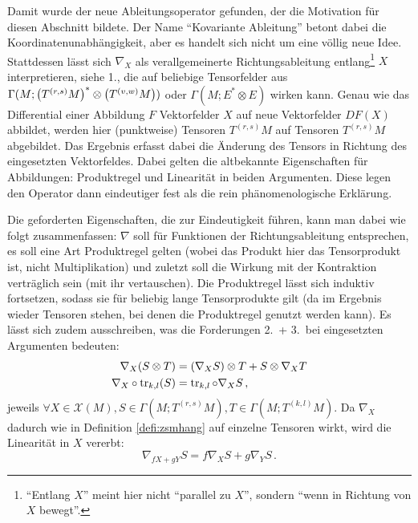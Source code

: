 \documentclass[../H_Analysis_main.tex]{subfiles}
\begin{document}
Damit wurde der neue Ableitungsoperator gefunden, der die Motivation für diesen Abschnitt bildete. Der Name \enquote{Kovariante Ableitung} betont dabei die Koordinatenunabhängigkeit, aber es handelt sich nicht um eine völlig neue Idee. Stattdessen lässt sich $\nabla_X$ als verallgemeinerte Richtungsableitung entlang\footnote{\enquote{Entlang $X$} meint hier nicht \enquote{parallel zu $X$}, sondern \enquote{wenn in Richtung von $X$ bewegt}.} $X$ interpretieren, siehe 1., die auf beliebige Tensorfelder aus $\Gamma(M; \qty(T^{(r, s)} M)^* \otimes \qty(T^{(v, w)} M))$ oder $\Gamma(M; E^* \otimes E)$ wirken kann. Genau wie das Differential einer Abbildung $F$ Vektorfelder $X$ auf neue Vektorfelder $DF(X)$ abbildet, werden hier (punktweise) Tensoren $T^{(r, s)} M$ auf Tensoren $T^{(r, s)} M$ abgebildet. Das Ergebnis erfasst dabei die Änderung des Tensors in Richtung des eingesetzten Vektorfeldes. Dabei gelten die altbekannte Eigenschaften für Abbildungen: Produktregel und Linearität in beiden Argumenten. Diese legen den Operator dann eindeutiger fest als die rein phänomenologische Erklärung.



Die geforderten Eigenschaften, die zur Eindeutigkeit führen, kann man dabei wie folgt zusammenfassen: $\nabla$ soll für Funktionen der Richtungsableitung entsprechen, es soll eine Art Produktregel gelten (wobei das Produkt hier das Tensorprodukt ist, nicht Multiplikation) und zuletzt soll die Wirkung mit der Kontraktion verträglich sein (mit ihr vertauschen). Die Produktregel lässt sich induktiv fortsetzen, sodass sie für beliebig lange Tensorprodukte gilt (da im Ergebnis wieder Tensoren stehen, bei denen die Produktregel genutzt werden kann). Es lässt sich zudem ausschreiben, was die Forderungen 2.~+ 3.~bei eingesetzten Argumenten bedeuten:
\begin{align*}
\nabla_X(S \otimes T) &= (\nabla_X S) \otimes T + S \otimes \nabla_X T 
\\
\nabla_X \circ \tr_{k, l}(S) &= \tr_{k, l} \circ \nabla_X S \, ,
\end{align*}
jeweils $\forall X \in \mathcal{X}(M), S \in \Gamma(M; T^{(r, s)}M), T \in \Gamma(M; T^{(k, l)}M)$. Da $\nabla_X$ dadurch wie in Definition \ref{defi:zsmhang} auf einzelne Tensoren wirkt, wird die Linearität in $X$ vererbt:
\begin{equation}
\nabla_{f X + g Y} S = f \nabla_X S + g \nabla_Y S \, .
\end{equation}
\end{document}
